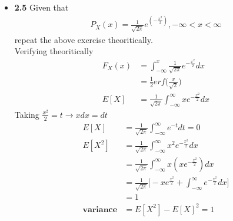 \documentclass[journal,12pt,twocolumn]{IEEEtran}
\begin{document}
\begin{itemize}
    \item \textbf{2.5} Given that 
    \begin{align}
        P_X(x) = \frac{1}{\sqrt{2\pi}}e^{(-\frac{x^2}{2})}, -\infty < x < \infty
    \end{align}
    repeat the above exercise theoritically.\\
    \solution Verifying theoritically
    \begin{align}
        F_X(x) &= \int_{-\infty}^{x}\frac{1}{\sqrt{2\pi}}e^{-\frac{x^2}{2}}dx \\
        &= \frac{1}{2} erf\bigg(\frac{x}{\sqrt{2}}\bigg)\\
        E[X]&= \frac{1}{\sqrt{2\pi}} \int_{-\infty}^{\infty}xe^{-\frac{x^2}{2}}dx 
    \end{align}
    Taking $\frac{x^2}{2} = t \rightarrow xdx = dt$
    \begin{align}
        E[X]&= \frac{1}{\sqrt{2\pi}} \int_{-\infty}^{\infty}e^{-t} dt = 0 \\
        E[X^2]&= \frac{1}{\sqrt{2\pi}} \int_{-\infty}^{\infty}x^2e^{-\frac{x^2}{2}}dx \\
        &= \frac{1}{\sqrt{2\pi}} \int_{-\infty}^{\infty}x(xe^{-\frac{x^2}{2}})dx \\
        &= \frac{1}{\sqrt{2\pi}} \bigg[-xe^{\frac{x^2}{2}}+\int_{-\infty}^{\infty}e^{-\frac{x^2}{2}} dx \bigg] \\
        &= 1 \\
        \textbf{variance} &= E[X^2] - E[X]^2 = 1
    \end{align}
\end{itemize}
\end{document}
